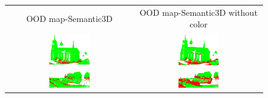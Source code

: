     \begin{figure}[h!]
        \centering
        \begin{tabular}{cc}
            OOD map-Semantic3D & OOD map-Semantic3D without color \\
            \includegraphics[width=0.33\textwidth, height=0.18\textheight]{images/ood_imgs/sem3d_of/prob/de_sem3d_OOD_1.pdf}&
            \includegraphics[width=0.33\textwidth, height=0.18\textheight]{images/ood_imgs/sem3d_of/prob/de_sem3d_of_OOD_1.pdf}\\

            \includegraphics[width=0.33\textwidth, height=0.18\textheight]{images/ood_imgs/sem3d_of/prob/de_sem3d_OOD_2.pdf}&
            \includegraphics[width=0.33\textwidth, height=0.18\textheight]{images/ood_imgs/sem3d_of/prob/de_sem3d_of_OOD_2.pdf}\\


\end{tabular}
\end{figure}
